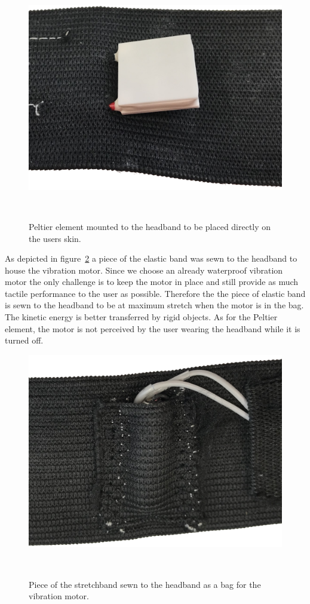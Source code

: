 \begin{figure}
	\includegraphics[width= \textwidth]{images/peltier.png}
	\caption{Peltier element mounted to the headband to be placed directly on the users skin.}~\label{fig:peltier}
\end{figure}

As depicted in figure~\ref{fig:headbandmotorbag} a piece of the elastic band was sewn to the headband to house the vibration motor.
Since we choose an already waterproof vibration motor the only challenge is to keep the motor in place and still provide as much tactile performance to the user as possible.
Therefore the the piece of elastic band is sewn to the headband to be at maximum stretch when the motor is in the bag.
The kinetic energy is better transferred by rigid objects.
As for the Peltier element, the motor is not perceived by the user wearing the headband while it is turned off.

\begin{figure}
	\includegraphics[width= \textwidth]{images/headbandmotorbag.png}
	\caption{Piece of the stretchband sewn to the headband as a bag for the vibration motor.}~\label{fig:headbandmotorbag}
\end{figure}

